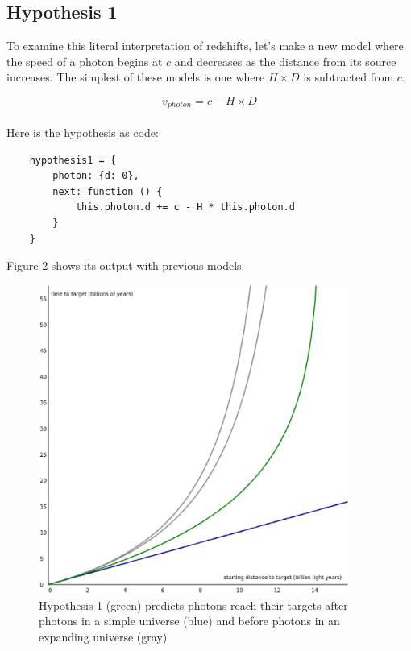 \documentclass{ws-mpla}
\begin{document}
\subsection{Hypothesis 1}

To examine this literal interpretation of redshifts, let's make a new model where the speed of a photon begins at $c$ and 
decreases as the distance from its source increases. The simplest of these models is one where $H \times D$ is subtracted from $c$.

\begin{equation}
v_{photon} = c - H \times D
\end{equation}\\

Here is the hypothesis as code:\\

\begin{verbatim}
    hypothesis1 = {
        photon: {d: 0},
        next: function () {
            this.photon.d += c - H * this.photon.d
        }
    }
\end{verbatim}

Figure 2 shows its output with previous models:

\begin{figure}[h]
\centerline{\includegraphics[width=4.0in]{graph_white_hypothesis1.eps}}
\vspace*{8pt}
\caption{Hypothesis 1 (green) predicts photons reach their targets after photons in a simple universe (blue) and before photons in an expanding universe (gray)}
\label{fig:hypothesis1}
\end{figure}
\end{document}
